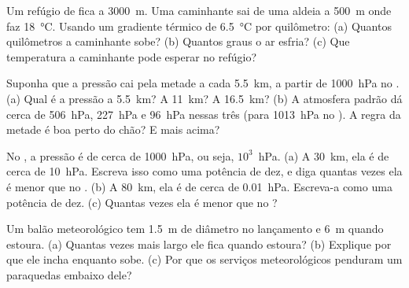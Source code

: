 \begin{exercise}[$\star\star$]\label{exo:g8:the-atmosphere:6}
Um refúgio de  fica a \qty{3000}{m}. Uma caminhante sai de uma
aldeia a \qty{500}{m} onde faz \qty{18}{\degreeCelsius}. Usando um
gradiente térmico de \qty{6.5}{\degreeCelsius} por quilômetro: (a) Quantos
quilômetros a caminhante sobe? (b) Quantos graus o ar esfria? (c) Que
temperatura a caminhante pode esperar no refúgio?
\end{exercise}

\begin{exercise}[$\star\star$]\label{exo:g8:the-atmosphere:7}
Suponha que a pressão cai pela metade a cada \qty{5.5}{km}, a partir de
\qty{1000}{hPa} no . (a) Qual é a pressão a \qty{5.5}{km}? A
\qty{11}{km}? A \qty{16.5}{km}? (b) A atmosfera padrão dá cerca de
\qty{506}{hPa}, \qty{227}{hPa} e \qty{96}{hPa} nessas três 
(para \qty{1013}{hPa} no ). A regra da metade é boa perto do
chão? E mais acima?
\end{exercise}

\begin{exercise}[$\star\star$]\label{exo:g8:the-atmosphere:8}
No , a pressão é de cerca de \qty{1000}{hPa}, ou seja, $10^3$~hPa.
(a) A \qty{30}{km}, ela é de cerca de \qty{10}{hPa}. Escreva isso como uma
potência de dez, e diga quantas vezes ela é menor que no .
(b) A \qty{80}{km}, ela é de cerca de \qty{0.01}{hPa}. Escreva-a como uma
potência de dez. (c) Quantas vezes ela é menor que no ?
\end{exercise}

\begin{exercise}[$\star\star$]\label{exo:g8:the-atmosphere:9}
Um balão meteorológico tem \qty{1.5}{m} de diâmetro no lançamento e
\qty{6}{m} quando estoura. (a) Quantas vezes mais largo ele fica quando
estoura? (b) Explique por que ele incha enquanto sobe. (c) Por que os
serviços meteorológicos penduram um paraquedas embaixo dele?
\end{exercise}

